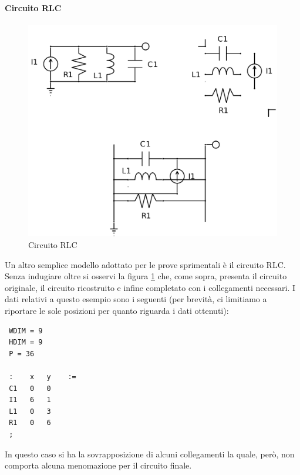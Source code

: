 \paragraph{Circuito RLC}
\begin{figure}[ht]
 \centering
 \includegraphics[scale=0.5]{immagini/rlc.pdf}
 \caption{Circuito RLC}
 \label{rlc}
\end{figure}
Un altro semplice modello adottato per le prove sprimentali è il circuito RLC. Senza indugiare oltre si osservi la figura \ref{rlc} che, come sopra, presenta il circuito originale, il circuito ricostruito e infine completato con i collegamenti necessari. I dati relativi a questo esempio sono i seguenti (per brevità, ci limitiamo a riportare le sole posizioni per quanto riguarda i dati ottenuti):
\small
\begin{verbatim}
 WDIM = 9
 HDIM = 9
 P = 36

 :    x   y    :=
 C1   0   0
 I1   6   1
 L1   0   3
 R1   0   6
 ;
\end{verbatim}
\normalsize
In questo caso si ha la sovrapposizione di alcuni collegamenti la quale, però, non comporta alcuna menomazione per il circuito finale.

